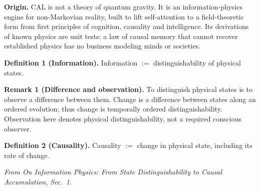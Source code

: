 \documentclass[10pt]{article}
\begin{document}
\vspace{2pt}
\begin{sheetbox}
\textbf{Origin.} CAL is not a theory of quantum gravity. It is an information-physics engine for non-Markovian reality, built to lift self-attention to a field-theoretic form from first principles of cognition, causality and intelligence. Its derivations of known physics are unit tests: a law of causal memory that cannot recover established physics has no business modeling minds or societies.\par\vspace{2pt}
\textbf{Definition 1 (Information).} Information $:=$ distinguishability of physical states.\par\vspace{2pt}
\textbf{Remark 1 (Difference and observation).} To distinguish physical states is to observe a difference between them. Change is a difference between states along an ordered evolution; thus change is temporally ordered distinguishability. Observation here denotes physical distinguishability, not a required conscious observer.\par\vspace{2pt}
\textbf{Definition 2 (Causality).} Causality $:=$ change in physical state, including its rate of change.\par\vspace{2pt}
{\footnotesize\textit{From On Information Physics: From State Distinguishability to Causal Accumulation, Sec.~1.}}
\end{sheetbox}
\end{document}
